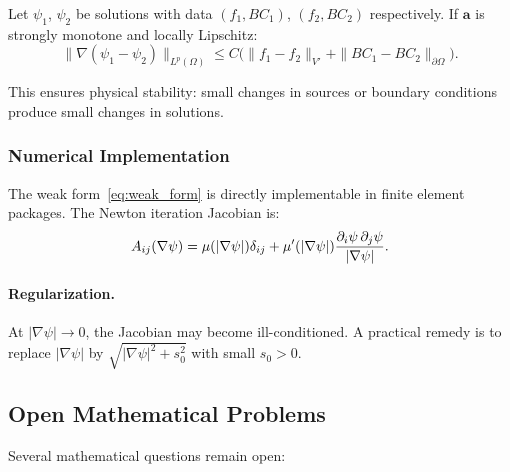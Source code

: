 \begin{theorem}\label{thm:continuous-dependence}
Let $\psi_1$, $\psi_2$ be solutions with data $(f_1, BC_1)$, $(f_2, BC_2)$ 
respectively. If $\mathbf{a}$ is strongly monotone and locally Lipschitz:
\begin{equation}
\|\nabla(\psi_1 - \psi_2)\|_{L^p(\Omega)} \leq C\big(\|f_1 - f_2\|_{V'} 
+ \|BC_1 - BC_2\|_{\partial\Omega}\big).
\end{equation}
\end{theorem}

This ensures physical stability: small changes in sources or boundary 
conditions produce small changes in solutions.

\subsubsection{Numerical Implementation}

The weak form~\eqref{eq:weak_form} is directly implementable in finite 
element packages. The Newton iteration Jacobian is:
\begin{equation}
A_{ij}(\nabla\psi) = \mu(|\nabla\psi|)\delta_{ij} 
+ \mu'(|\nabla\psi|)\frac{\partial_i\psi\,\partial_j\psi}{|\nabla\psi|}.
\label{eq:fem-jacobian}
\end{equation}

\paragraph{Regularization.}
At $|\nabla\psi| \to 0$, the Jacobian may become ill-conditioned. A practical 
remedy is to replace $|\nabla\psi|$ by $\sqrt{|\nabla\psi|^2 + s_0^2}$ with 
small $s_0 > 0$.

\subsection{Open Mathematical Problems}\label{sec:math_open}

Several mathematical questions remain open:

